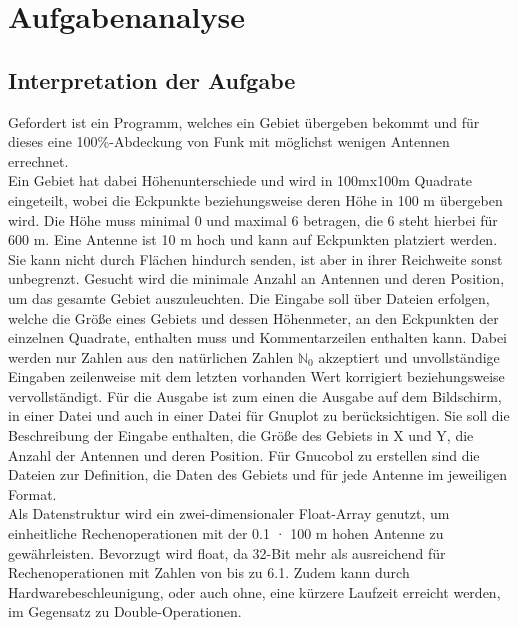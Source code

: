 \chapter{Aufgabenanalyse}\label{ch:aufgabenanalyse}


\section{Interpretation der Aufgabe}\label{sec:interpretation-der-aufgabe}
Gefordert ist ein Programm, welches ein Gebiet übergeben bekommt und für dieses eine 100\%-Abdeckung von Funk mit möglichst wenigen Antennen errechnet.\\
Ein Gebiet hat dabei Höhenunterschiede und wird in 100mx100m Quadrate eingeteilt, wobei die Eckpunkte beziehungsweise deren Höhe in 100 m übergeben wird.
Die Höhe muss minimal 0 und maximal 6 betragen, die 6 steht hierbei für 600 m.
Eine Antenne ist 10 m hoch und kann auf Eckpunkten platziert werden.
Sie kann nicht durch Flächen hindurch senden, ist aber in ihrer Reichweite sonst unbegrenzt.
Gesucht wird die minimale Anzahl an Antennen und deren Position, um das gesamte Gebiet auszuleuchten.
Die Eingabe soll über Dateien erfolgen, welche die Größe eines Gebiets und dessen Höhenmeter, an den Eckpunkten der einzelnen Quadrate, enthalten muss und Kommentarzeilen enthalten kann.
Dabei werden nur Zahlen aus den natürlichen Zahlen $\mathbb{N}_0$ akzeptiert und unvollständige Eingaben zeilenweise mit dem letzten vorhanden Wert korrigiert beziehungsweise vervollständigt.
Für die Ausgabe ist zum einen die Ausgabe auf dem Bildschirm, in einer Datei und auch in einer Datei für Gnuplot zu berücksichtigen.
Sie soll die Beschreibung der Eingabe enthalten, die Größe des Gebiets in X und Y, die Anzahl der Antennen und deren Position.
Für Gnucobol zu erstellen sind die Dateien zur Definition, die Daten des Gebiets und für jede Antenne im jeweiligen Format.\\

Als Datenstruktur wird ein zwei-dimensionaler Float-Array genutzt, um einheitliche Rechenoperationen mit der 0.1 · 100 m hohen Antenne zu gewährleisten.
Bevorzugt wird float, da 32-Bit mehr als ausreichend für Rechenoperationen mit Zahlen von bis zu 6.1.
Zudem kann durch Hardwarebeschleunigung, oder auch ohne, eine kürzere Laufzeit erreicht werden, im Gegensatz zu Double-Operationen.\\

